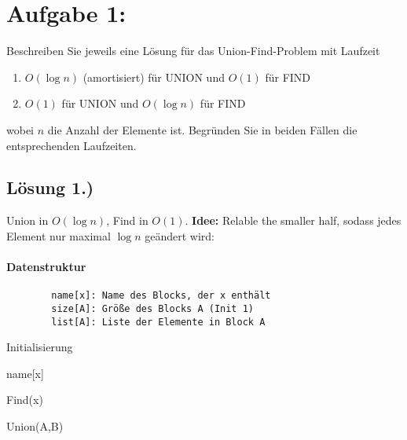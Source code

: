 \section{Aufgabe 1:}
	Beschreiben Sie jeweils eine Lösung für das Union-Find-Problem mit Laufzeit
	\begin{enumerate}
		\item $O(\log n)$ (amortisiert) für UNION und $O(1)$ für FIND
		\item $O(1)$ für UNION und $O(\log n)$ für FIND
	\end{enumerate}	
	wobei $n$ die Anzahl der Elemente ist. Begründen Sie in beiden Fällen die entsprechenden Laufzeiten.

	\subsection*{Lösung 1.)} Union in $ O(\log n) $, Find in $ O(1) $. \textbf{Idee:} Relable the smaller half, sodass jedes Element nur maximal $ \log n $ geändert wird:
	\paragraph{Datenstruktur}
	\begin{verbatim}
	    name[x]: Name des Blocks, der x enthält
	    size[A]: Größe des Blocks A (Init 1)
	    list[A]: Liste der Elemente in Block A
	\end{verbatim}
	    \vspace{5mm}
    \begin{algorithm}[H]
    \SetAlgoLined
    \caption{Initialisierung}
    \end{algorithm}
        \vspace{5mm}
    \begin{algorithm}[H]
    \SetAlgoLined
    \Return name[x]\;
    \caption{Find(x)}
    \end{algorithm}
        \vspace{5mm}
    \begin{algorithm}[H]

    \caption{Union(A,B)}
    \end{algorithm}
    
